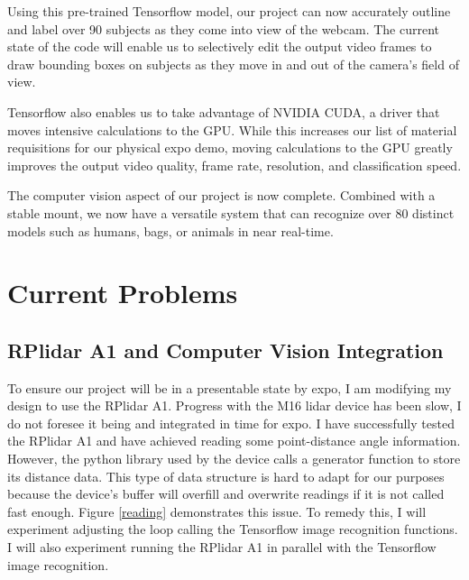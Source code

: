 \documentclass[onecolumn, draftclsnofoot,10pt, compsoc]{IEEEtran}
\begin{document}
\begin{singlespace}
			Using this pre-trained Tensorflow model, our project can now accurately outline and label over 90 subjects as they come into view of the webcam.
			The current state of the code will enable us to selectively edit the output video frames to draw bounding boxes on subjects as they move in and out of the camera's field of view.


			Tensorflow also enables us to take advantage of NVIDIA CUDA, a driver that moves intensive calculations to the GPU.
			While this increases our list of material requisitions for our physical expo demo, moving calculations to the GPU greatly improves the output video quality, frame rate, resolution, and classification speed. \cite{nvidia}
			

			The computer vision aspect of our project is now complete.
			Combined with a stable mount, we now have a versatile system that can recognize over 80 distinct models such as humans, bags, or animals in near real-time.
			

	\section{Current Problems}
		\subsection{RPlidar A1 and Computer Vision Integration}
			To ensure our project will be in a presentable state by expo, I am modifying my design to use the RPlidar A1.
			Progress with the M16 lidar device has been slow, I do not foresee it being and integrated in time for expo.
			I have successfully tested the RPlidar A1 and have achieved reading some point-distance angle information.
			However, the python library used by the device calls a generator function to store its distance data.
			This type of data structure is hard to adapt for our purposes because the device's buffer will overfill and overwrite readings if it is not called fast enough.
			Figure \ref{reading} demonstrates this issue.
			To remedy this, I will experiment adjusting the loop calling the Tensorflow image recognition functions.
			I will also experiment running the RPlidar A1 in parallel with the Tensorflow image recognition.


\end{singlespace}
\end{document}
